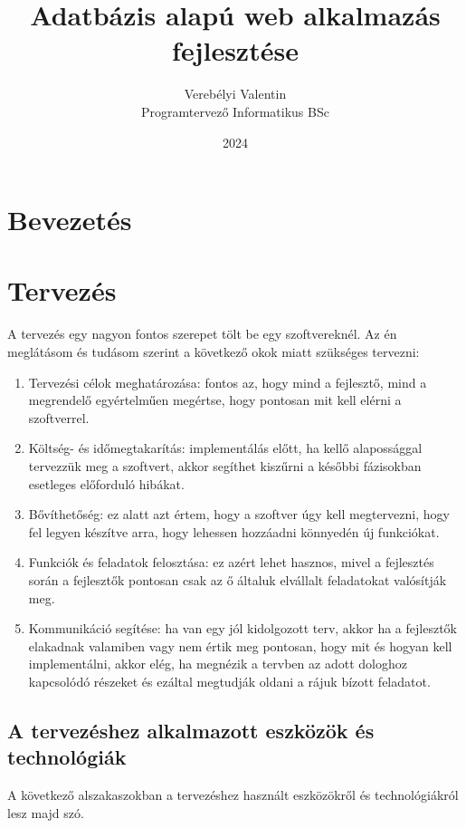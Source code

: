 \documentclass[]{thesis-ekf}
\theoremstyle{definition}
\theoremstyle{remark}
\begin{document}
	\title{Adatbázis alapú web alkalmazás fejlesztése}
	\author{Verebélyi Valentin\\Programtervező Informatikus BSc}
	\date{2024}
	\maketitle
	\tableofcontents
	
	\chapter*{Bevezetés}
	
	\chapter{Tervezés}
		A tervezés egy nagyon fontos szerepet tölt be egy szoftvereknél. Az én meglátásom és tudásom szerint a következő okok miatt szükséges tervezni:
		\begin{enumerate}
			\item Tervezési célok meghatározása: fontos az, hogy mind a fejlesztő, mind a megrendelő egyértelműen megértse, hogy pontosan mit kell elérni a szoftverrel.
			\item Költség- és időmegtakarítás: implementálás előtt, ha kellő alapossággal tervezzük meg a szoftvert, akkor segíthet kiszűrni a későbbi fázisokban esetleges előforduló hibákat. 
			\item Bővíthetőség: ez alatt azt értem, hogy a szoftver úgy kell megtervezni, hogy fel legyen készítve arra, hogy lehessen hozzáadni könnyedén új funkciókat.
			\item Funkciók és feladatok felosztása: ez azért lehet hasznos, mivel a fejlesztés során a fejlesztők pontosan csak az ő általuk elvállalt feladatokat valósítják meg.
			\item Kommunikáció segítése: ha van egy jól kidolgozott terv, akkor ha a fejlesztők elakadnak valamiben vagy nem értik meg pontosan, hogy mit és hogyan kell implementálni, akkor elég, ha megnézik a tervben az adott dologhoz kapcsolódó részeket és ezáltal megtudják oldani a rájuk bízott feladatot.
		\end{enumerate}
	\section{A tervezéshez alkalmazott eszközök és technológiák}
		A következő alszakaszokban a tervezéshez használt eszközökről és technológiákról lesz majd szó.
\end{document}
